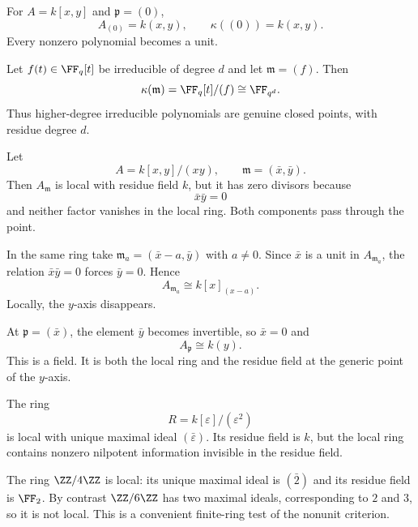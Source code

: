 \begin{example}
For $A=k[x,y]$ and $\mathfrak p=(0)$,
\[
A_{(0)}=k(x,y),
\qquad
\kappa((0))=k(x,y).
\]
Every nonzero polynomial becomes a unit.
\end{example}

\begin{example}
Let $f(t)\in\FF_q[t]$ be irreducible of degree $d$ and let $\mathfrak m=(f)$.  Then
\[
\kappa(\mathfrak m)
=\FF_q[t]/(f)
\cong\FF_{q^d}.
\]
Thus higher-degree irreducible polynomials are genuine closed points, with residue degree $d$.
\end{example}

\begin{example}
Let
\[
A=k[x,y]/(xy),
\qquad
\mathfrak m=(\bar x,\bar y).
\]
Then $A_{\mathfrak m}$ is local with residue field $k$, but it has zero divisors because
\[
\bar x\bar y=0
\]
and neither factor vanishes in the local ring.  Both components pass through the point.
\end{example}

\begin{example}
In the same ring take $\mathfrak m_a=(\bar x-a,\bar y)$ with $a\neq0$.  Since $\bar x$ is a
unit in $A_{\mathfrak m_a}$, the relation $\bar x\bar y=0$ forces $\bar y=0$.  Hence
\[
A_{\mathfrak m_a}\cong k[x]_{(x-a)}.
\]
Locally, the $y$-axis disappears.
\end{example}

\begin{example}
At $\mathfrak p=(\bar x)$, the element $\bar y$ becomes invertible, so $\bar x=0$ and
\[
A_{\mathfrak p}\cong k(y).
\]
This is a field.  It is both the local ring and the residue field at the generic point of the
$y$-axis.
\end{example}

\begin{example}
The ring
\[
R=k[\varepsilon]/(\varepsilon^2)
\]
is local with unique maximal ideal $(\bar\varepsilon)$.  Its residue field is $k$, but the
local ring contains nonzero nilpotent information invisible in the residue field.
\end{example}

\begin{example}[$\ZZ/4\ZZ$ versus $\ZZ/6\ZZ$]
The ring $\ZZ/4\ZZ$ is local: its unique maximal ideal is $(\bar2)$ and its residue field is
$\FF_2$.  By contrast $\ZZ/6\ZZ$ has two maximal ideals, corresponding to $2$ and $3$, so it
is not local.  This is a convenient finite-ring test of the nonunit criterion.
\end{example}

